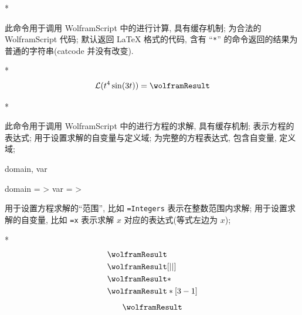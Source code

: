 \documentclass[
  hyper, lang=cn, 
  class=l3dox, 
]{../../zlatex/code/ztex}
\begin{document}
\begin{function}[added=2025-05-15]{\wolfram}
  \begin{syntax}
    *
  \end{syntax}
  此命令用于调用 WolframScript 中的进行计算, 具有缓存机制;  为合法的 WolframScript 代码;
  默认返回 \LaTeX{} 格式的代码, 含有 ``\texttt{*}'' 的命令返回的结果为普通的字符串(catcode 并没有改变).
\end{function}
\begin{DocExample}*
\[
  \mathcal{L}(t^4\sin(3t)) = \wolframResult
\]
\end{DocExample}


\begin{function}[added=2025-05-15]{\wolframSolve}
  \begin{syntax}
    *
  \end{syntax}
  此命令用于调用 WolframScript 中的进行方程的求解, 具有缓存机制;  表示方程的表达式;
   用于设置求解的自变量与定义域;  为完整的方程表达式, 包含自变量, 定义域; 
\end{function}

\begin{keyval}[parent=ztikz/wolfram/solve]{domain, var}
  \begin{syntax}
    domain = >
    var    = >
  \end{syntax}
   用于设置方程求解的``范围'', 比如 \texttt{=Integers} 表示在整数范围内求解;
   用于设置求解的自变量, 比如 \texttt{=x} 表示求解 $x$ 对应的表达式(等式左边为 $x$);
\end{keyval}

\begin{DocExample}*
\begin{align}
  &  \wolframResult \\
  &  \wolframResult[||] \\
  &  \wolframResult* \\
  &  \wolframResult*[3-1]
\end{align}
\begin{align}
  \wolframResult
\end{align}
\end{DocExample}
\end{document}
